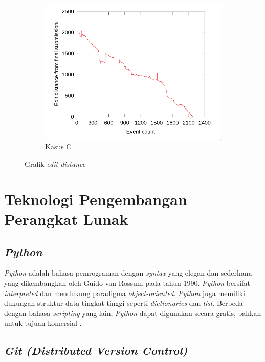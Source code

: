 \begin{figure}
\begin{subfigure}{\linewidth}
    \centering
    \includegraphics[scale=.25]{img/ed-c}
    \caption{Kasus C}\label{fig:edit-distance-c}
  \end{subfigure}
  \caption{Grafik \emph{edit-distance}}\label{fig:test}
\end{figure}

\section{Teknologi Pengembangan Perangkat Lunak}

\subsection{\emph{Python}}

\emph{Python} adalah bahasa pemrograman dengan \emph{syntax} yang elegan dan
sederhana yang dikembangkan oleh Guido van Rossum pada tahun 1990. \emph{Python}
bersifat \emph{interpreted} dan mendukung paradigma
\emph{object-oriented}. \emph{Python} juga memiliki dukungan struktur data
tingkat tinggi seperti \emph{dictionaries} dan \emph{list}. Berbeda dengan
bahasa \emph{scripting} yang lain, \emph{Python} dapat digunakan secara gratis,
bahkan untuk tujuan komersial \parencite{sanner1999python}.

\subsection{\emph{Git (Distributed Version Control)}}

